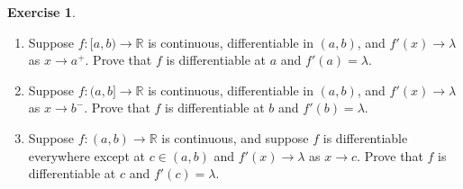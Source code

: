 \documentclass[12pt]{article}
\theoremstyle{definition}
\newtheorem{exercise}{Exercise}
\begin{document}
\begin{exercise}
    \hfill
    \begin{enumerate}[label=(\alph*)]
        \item Suppose \(f : [a, b) \to \mathbb{R}\) is continuous, differentiable in \((a, b)\), and \(f'(x) \to \lambda\) as \(x \to a^{+}\). Prove that \(f\) is differentiable at \(a\) and \(f'(a) = \lambda\).
        \item Suppose \(f : (a, b] \to \mathbb{R}\) is continuous, differentiable in \((a, b)\), and \(f'(x) \to \lambda\) as \(x \to b^{-}\). Prove that \(f\) is differentiable at \(b\) and \(f'(b) = \lambda\).
        \item Suppose \(f : (a, b) \to \mathbb{R}\) is continuous, and suppose \(f\) is differentiable everywhere except at \(c \in (a, b)\) and \(f'(x) \to \lambda\) as \(x \to c\). Prove that \(f\) is differentiable at \(c\) and \(f'(c) = \lambda\).
    \end{enumerate}
\end{exercise}
\end{document}
